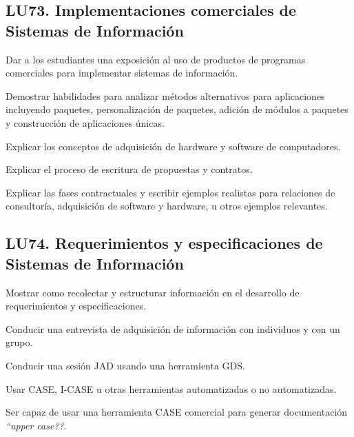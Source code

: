 \subsection{LU73. Implementaciones comerciales de Sistemas de Información}\label{sec:BOK-LU73}\label{sec:LU73}
\begin{LearningUnit}
\begin{LUGoal}
\item Dar a los estudiantes una exposición al uso de productos de programas comerciales para implementar sistemas de información.
\end{LUGoal}

\begin{LUObjective}
\item Demostrar habilidades para analizar métodos alternativos para aplicaciones incluyendo paquetes, personalización de paquetes, adición de módulos a paquetes y construcción de aplicaciones únicas.
\item Explicar los conceptos de adquisición de hardware y software de computadores.
\item Explicar el proceso de escritura de propuestas y contratos.
\item Explicar las fases contractuales y escribir ejemplos realistas para relaciones de consultoría, adquisición de software y hardware, u otros ejemplos relevantes.
\end{LUObjective}
\end{LearningUnit}

\subsection{LU74. Requerimientos y especificaciones de Sistemas de Información}\label{sec:BOK-LU74}\label{sec:LU74}
\begin{LearningUnit}
\begin{LUGoal}
\item Mostrar como recolectar y estructurar información en el desarrollo de requerimientos y especificaciones.
\end{LUGoal}

\begin{LUObjective}
\item Conducir una entrevista de adquisición de información con individuos y con un grupo.
\item Conducir una sesión JAD usando una herramienta GDS.
\item Usar CASE, I-CASE u otras herramientas automatizadas o no automatizadas.
\item Ser capaz de usar una herramienta CASE comercial para generar documentación \textit{``upper case??}.
\end{LUObjective}
\end{LearningUnit}

